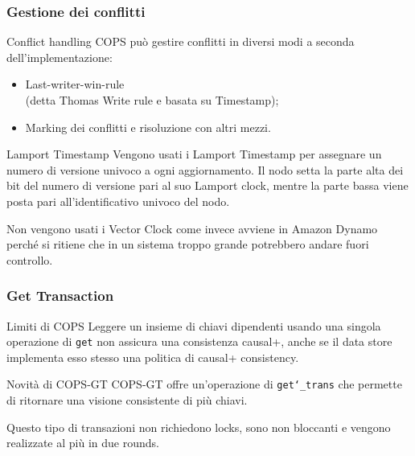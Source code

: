 \begin{frame}
\frametitle{Gestione dei conflitti}
\begin{block}{Conflict handling}
COPS può gestire conflitti in diversi modi a seconda dell'implementazione:
	\begin{itemize}
		\item<1-> Last-writer-win-rule \\
				  (detta Thomas Write rule e basata su Timestamp);
		\item<1-> Marking dei conflitti e risoluzione con altri mezzi.
	\end{itemize}
\end{block}
\begin{block}{Lamport Timestamp}
Vengono usati i Lamport Timestamp per assegnare un numero di versione univoco a ogni aggiornamento.
Il nodo setta la parte alta dei bit del numero di versione pari al suo Lamport clock, mentre la
parte bassa viene posta pari all'identificativo univoco del nodo. \\
\end{block}
Non vengono usati i Vector Clock come invece avviene in Amazon Dynamo perché
si ritiene che in un sistema troppo grande potrebbero andare fuori controllo.
\end{frame}

\begin{frame}
\frametitle{Get Transaction}
\begin{block}{Limiti di COPS}
Leggere un insieme di chiavi dipendenti usando una singola operazione di \texttt{get}
non assicura una consistenza causal+, anche se il data store implementa esso stesso
una politica di causal+ consistency.
\end{block}
\begin{block}{Novità di COPS-GT}
COPS-GT offre un'operazione di \texttt{get\char`_trans} che permette di
ritornare una visione consistente di più chiavi.
\end{block}
Questo tipo di transazioni non richiedono locks, sono non bloccanti e
vengono realizzate al più in due rounds.
\end{frame}

